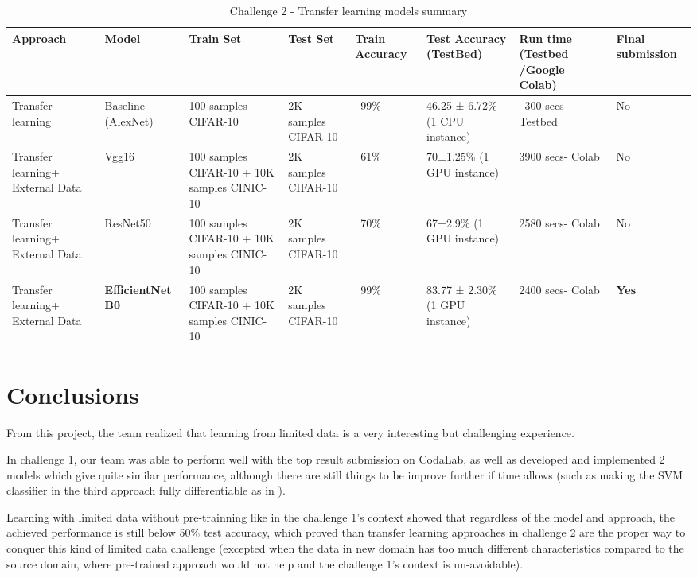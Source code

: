 \documentclass[10pt,twocolumn,letterpaper]{article}
\begin{document}
\begin{table*}[h!]
    \caption{Challenge 2 - Transfer learning models summary}
    \label{table:tbl_Transfer_learning_models_summary}
    \centering
    \begin{tabular}{|p{1.5cm}|p{2cm}|p{3cm}|p{1.5cm}|p{1cm}|p{1.5cm}|p{1cm}|p{1cm}|}
        \hline
        Approach & Model & Train Set & Test Set & Train Accuracy & Test Accuracy (TestBed) & Run time (Testbed /Google Colab) & Final submission \\
        \hline
        Transfer learning & Baseline (AlexNet) & 100 samples CIFAR-10 & 2K samples CIFAR-10 & ~99\% & 46.25 ± 6.72\% (1 CPU instance) & ~300 secs-Testbed & No \\
        \hline
        Transfer learning+ External Data & Vgg16 & 100 samples CIFAR-10 + 10K samples CINIC-10 & 2K samples CIFAR-10 & ~61\% & 70±1.25\% (1 GPU instance) & 3900 secs- Colab & No \\
        \hline
        Transfer learning+ External Data & ResNet50 & 100 samples CIFAR-10 + 10K samples CINIC-10 & 2K samples CIFAR-10 & ~70\% & 67±2.9\% (1 GPU instance) & 2580 secs- Colab & No \\
        \hline
        Transfer learning+ External Data & \textbf{EfficientNet B0} & 100 samples CIFAR-10 + 10K samples CINIC-10 & 2K samples CIFAR-10 & ~99\% & 83.77 ± 2.30\% (1 GPU instance) & 2400 secs- Colab & \textbf{Yes} \\
        \hline
    \end{tabular}
\end{table*}


\section{Conclusions}

From this project, the team realized that learning from limited data is a very interesting but challenging experience.

In challenge 1, our team was able to perform well with the top result submission on CodaLab, as well as developed and implemented 2 models which give quite similar performance, although there are still things to be improve further if time allows (such as making the SVM classifier in  the third approach fully differentiable as in \cite{tang13_dl_svm}).

Learning with limited data without pre-trainning like in the challenge 1's context showed that regardless of the model and approach, the achieved performance is still below 50\% test accuracy, which proved than transfer learning approaches in challenge 2 are the proper way to conquer this kind of limited data challenge (excepted when the data in new domain has too much different characteristics compared to the source domain, where pre-trained approach would not help and the challenge 1's context is un-avoidable). 
\end{document}

